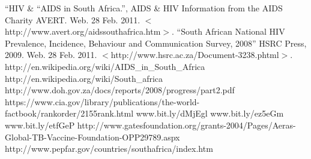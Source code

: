 \documentclass[12pt]{report}
\begin{document}
\begin{thebibliography}{99}
    ``HIV \& ``AIDS in South Africa.'',
        AIDS \& HIV Information from the AIDS Charity AVERT. Web. 28 Feb. 2011. $<$http://www.avert.org/aidssouthafrica.htm$>$.
    ``South African National HIV Prevalence, Incidence, Behaviour and Communication Survey, 2008''
        HSRC Press, 2009. Web. 28 Feb. 2011. $<$http://www.hsrc.ac.za/Document-3238.phtml$>$. 
    http://en.wikipedia.org/wiki/AIDS\_in\_South\_Africa
    http://en.wikipedia.org/wiki/South\_africa
    http://www.doh.gov.za/docs/reports/2008/progress/part2.pdf
    https://www.cia.gov/library/publications/the-world-factbook/rankorder/2155rank.html
    www.bit.ly/dMjEgl
    www.bit.ly/ez5eGm
    www.bit.ly/etfGeP
    http://www.gatesfoundation.org/grants-2004/Pages/Aeras-Global-TB-Vaccine-Foundation-OPP29789.aspx
    http://www.pepfar.gov/countries/southafrica/index.htm
\end{thebibliography}
\end{document}
